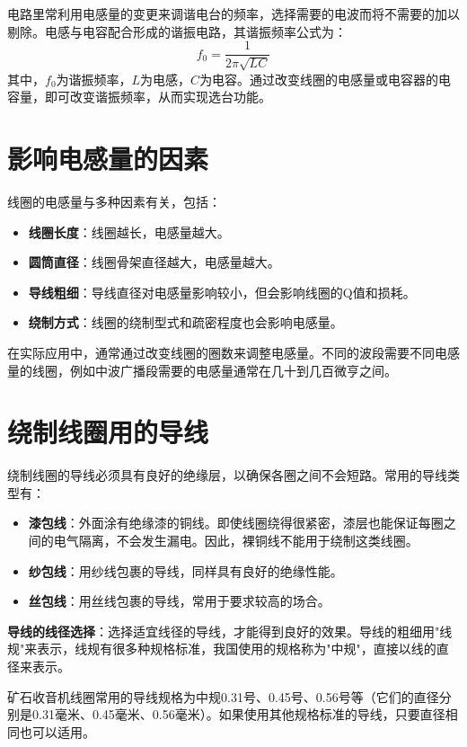 \documentclass[12pt,UTF8]{ctexbook}
\begin{document}
电路里常利用电感量的变更来调谐电台的频率，选择需要的电波而将不需要的加以剔除。电感与电容配合形成的谐振电路，其谐振频率公式为：
\[ f_0 = \frac{1}{2\pi\sqrt{LC}} \]
其中，\( f_0 \)为谐振频率，\( L \)为电感，\( C \)为电容。通过改变线圈的电感量或电容器的电容量，即可改变谐振频率，从而实现选台功能。

\section{影响电感量的因素}

线圈的电感量与多种因素有关，包括：
\begin{itemize}
	\item \textbf{线圈长度}：线圈越长，电感量越大。
	\item \textbf{圆筒直径}：线圈骨架直径越大，电感量越大。
	\item \textbf{导线粗细}：导线直径对电感量影响较小，但会影响线圈的Q值和损耗。
	\item \textbf{绕制方式}：线圈的绕制型式和疏密程度也会影响电感量。
\end{itemize}

在实际应用中，通常通过改变线圈的圈数来调整电感量。不同的波段需要不同电感量的线圈，例如中波广播段需要的电感量通常在几十到几百微亨之间。

\section{绕制线圈用的导线}

绕制线圈的导线必须具有良好的绝缘层，以确保各圈之间不会短路。常用的导线类型有：

\begin{itemize}
	\item \textbf{漆包线}：外面涂有绝缘漆的铜线。即使线圈绕得很紧密，漆层也能保证每圈之间的电气隔离，不会发生漏电。因此，裸铜线不能用于绕制这类线圈。
	\item \textbf{纱包线}：用纱线包裹的导线，同样具有良好的绝缘性能。
	\item \textbf{丝包线}：用丝线包裹的导线，常用于要求较高的场合。
\end{itemize}

\textbf{导线的线径选择}：选择适宜线径的导线，才能得到良好的效果。导线的粗细用"线规"来表示，线规有很多种规格标准，我国使用的规格称为"中规"，直接以线的直径来表示。

矿石收音机线圈常用的导线规格为中规0.31号、0.45号、0.56号等（它们的直径分别是0.31毫米、0.45毫米、0.56毫米）。如果使用其他规格标准的导线，只要直径相同也可以适用。
\end{document}
